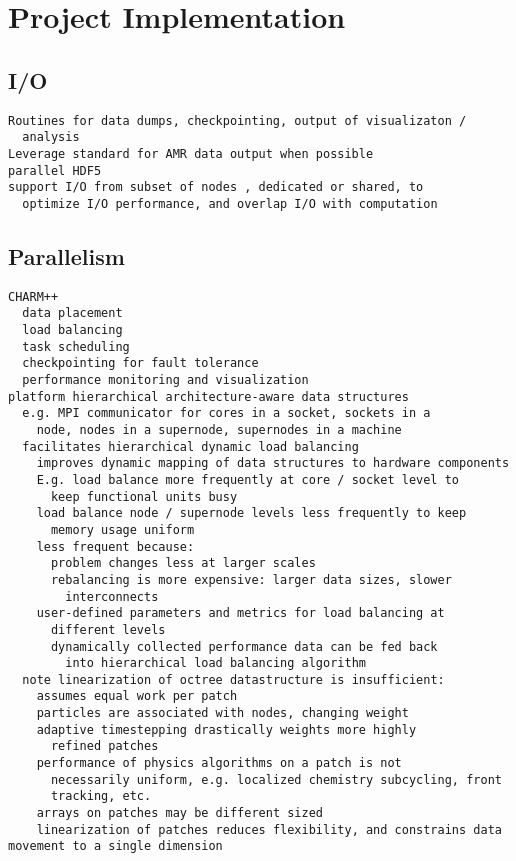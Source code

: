 \documentclass[14pt,letter]{article}
\begin{document}
\section{Project Implementation}

\subsection{I/O}

\begin{verbatim}
Routines for data dumps, checkpointing, output of visualizaton /
  analysis
Leverage standard for AMR data output when possible
parallel HDF5
support I/O from subset of nodes , dedicated or shared, to
  optimize I/O performance, and overlap I/O with computation
\end{verbatim}

\subsection{Parallelism}

\begin{verbatim}
CHARM++ 
  data placement
  load balancing
  task scheduling
  checkpointing for fault tolerance
  performance monitoring and visualization
platform hierarchical architecture-aware data structures
  e.g. MPI communicator for cores in a socket, sockets in a
    node, nodes in a supernode, supernodes in a machine
  facilitates hierarchical dynamic load balancing
    improves dynamic mapping of data structures to hardware components
    E.g. load balance more frequently at core / socket level to
      keep functional units busy
    load balance node / supernode levels less frequently to keep
      memory usage uniform
    less frequent because:
      problem changes less at larger scales
      rebalancing is more expensive: larger data sizes, slower
        interconnects
    user-defined parameters and metrics for load balancing at
      different levels
      dynamically collected performance data can be fed back
        into hierarchical load balancing algorithm
  note linearization of octree datastructure is insufficient:
    assumes equal work per patch
    particles are associated with nodes, changing weight
    adaptive timestepping drastically weights more highly
      refined patches
    performance of physics algorithms on a patch is not
      necessarily uniform, e.g. localized chemistry subcycling, front
      tracking, etc.
    arrays on patches may be different sized
    linearization of patches reduces flexibility, and constrains data movement to a single dimension
\end{verbatim}
\end{document}
